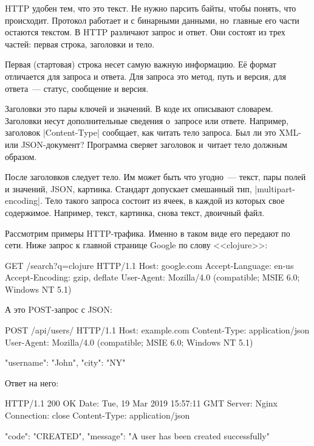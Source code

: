 HTTP удобен тем, что это текст. Не нужно парсить байты, чтобы понять, что
происходит. Протокол работает и с бинарными данными, но~главные его части
остаются текстом. В HTTP различают запрос и ответ. Они состоят из трех частей:
первая строка, заголовки и тело.

Первая (стартовая) строка несет самую важную информацию. Е\"{е} формат отличается
для запроса и ответа. Для запроса это метод, путь и версия, для ответа~---
статус, сообщение и версия.


Заголовки это пары ключей и значений. В коде их описывают словарем. Заголовки
несут дополнительные сведения о~запросе или ответе. Например, заголовок
\spverb|Content-Type| сообщает, как читать тело запроса. Был ли это XML- или
JSON-документ? Программа сверяет заголовок и~читает тело должным образом.


После заголовков следует тело. Им может быть что угодно~--- текст, пары полей и
значений, JSON, картинка. Стандарт допускает смешанный тип,
\spverb|multipart-encoding|. Тело такого запроса состоит из ячеек, в каждой из
которых свое содержимое. Например, текст, картинка, снова текст, двоичный файл.

Рассмотрим примеры HTTP-трафика. Именно в таком виде его передают по сети. Ниже
запрос к главной странице Google по слову <<clojure>>:

\begin{english}
  \begin{http}
GET /search?q=clojure HTTP/1.1
Host: google.com
Accept-Language: en-us
Accept-Encoding: gzip, deflate
User-Agent: Mozilla/4.0 (compatible; MSIE 6.0; Windows NT 5.1)
  \end{http}
\end{english}

\noindent
А это POST-запрос с JSON:

\begin{english}
  \begin{http}
POST /api/users/ HTTP/1.1
Host: example.com
Content-Type: application/json
User-Agent: Mozilla/4.0 (compatible; MSIE 6.0; Windows NT 5.1)

{
  "username": "John",
  "city": "NY"
}
  \end{http}
\end{english}

\noindent
Ответ на него:

\begin{english}
  \begin{http}
HTTP/1.1 200 OK
Date: Tue, 19 Mar 2019 15:57:11 GMT
Server: Nginx
Connection: close
Content-Type: application/json

{
  "code": "CREATED",
  "message": "A user has been created successfully"
}
  \end{http}
\end{english}

